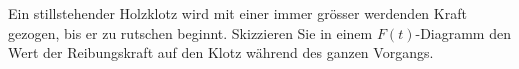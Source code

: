 Ein stillstehender Holzklotz wird mit einer immer grösser werdenden Kraft gezogen, bis er zu rutschen beginnt. Skizzieren Sie in einem $F(t)$-Diagramm den Wert der Reibungskraft auf den Klotz während des ganzen Vorgangs.
